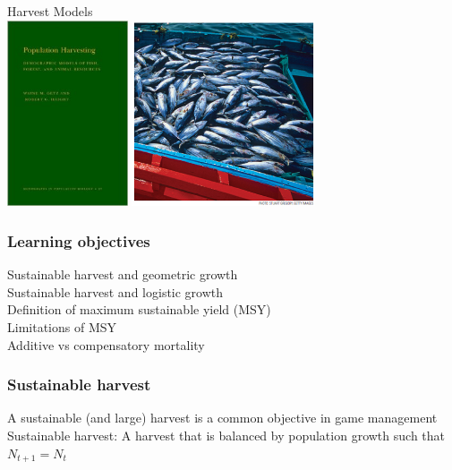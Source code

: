 \documentclass[color=usenames,dvipsnames]{beamer}\usepackage[]{graphicx}\usepackage[]{color}
\begin{document}
\begin{frame}[plain]
  \begin{center}
    {\huge Harvest Models} \\
    \vfill
    \includegraphics[height=5.5cm,keepaspectratio]{figs/book}
    \hspace{0.3cm}
    \includegraphics[height=5.5cm,keepaspectratio]{figs/tuna}
  \end{center}
\end{frame}


\begin{frame}
  \frametitle{Learning objectives}
  \large
  Sustainable harvest and geometric growth \\
  \vfill
  Sustainable harvest and logistic growth \\
  \vfill
  Definition of maximum sustainable yield (MSY) \\
  \vfill
  Limitations of MSY \\
  \vfill
  Additive vs compensatory mortality
\end{frame}





\begin{frame}
  \frametitle{Sustainable harvest}
  \large
  {%
    A sustainable (and large) harvest is a common
    objective in game management}
  \vfill
  \pause
  {%
    Sustainable harvest:}
  A harvest that is balanced by population growth such that
  $N_{t+1} = N_t$
\end{frame}
\end{document}
